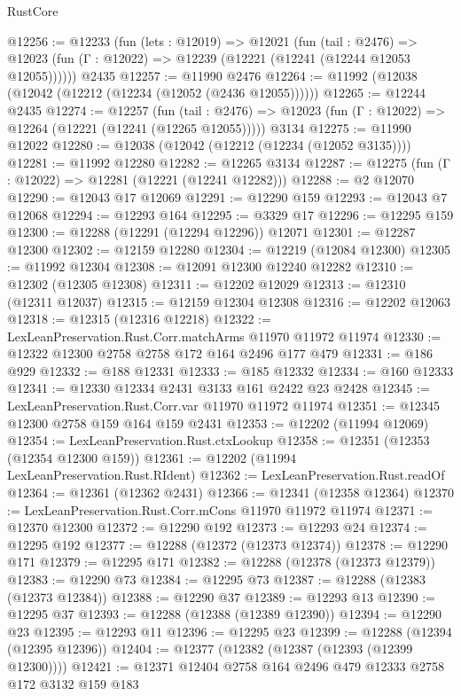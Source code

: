 \begin{lexlean}{RustCore}
\begin{coremodule}
@12256 := @12233
    (fun (lets : @12019) =>
    @12021
      (fun (tail : @2476) =>
      @12023 (fun (Γ : @12022) => @12239 (@12221 (@12241 (@12244 @12053 @12055))))))
    @2435
@12257 := @11990 @2476
@12264 := @11992 (@12038 (@12042 (@12212 (@12234 (@12052 (@2436 @12055))))))
@12265 := @12244 @2435
@12274 := @12257
    (fun (tail : @2476) => @12023 (fun (Γ : @12022) => @12264 (@12221 (@12241 (@12265 @12055)))))
    @3134
@12275 := @11990 @12022
@12280 := @12038 (@12042 (@12212 (@12234 (@12052 @3135))))
@12281 := @11992 @12280
@12282 := @12265 @3134
@12287 := @12275 (fun (Γ : @12022) => @12281 (@12221 (@12241 @12282)))
@12288 := @2 @12070
@12290 := @12043 @17 @12069
@12291 := @12290 @159
@12293 := @12043 @7 @12068
@12294 := @12293 @164
@12295 := @3329 @17
@12296 := @12295 @159
@12300 := @12288 (@12291 (@12294 @12296)) @12071
@12301 := @12287 @12300
@12302 := @12159 @12280
@12304 := @12219 (@12084 @12300)
@12305 := @11992 @12304
@12308 := @12091 @12300 @12240 @12282
@12310 := @12302 (@12305 @12308)
@12311 := @12202 @12029
@12313 := @12310 (@12311 @12037)
@12315 := @12159 @12304 @12308
@12316 := @12202 @12063
@12318 := @12315 (@12316 @12218)
@12322 := LexLeanPreservation.Rust.Corr.matchArms @11970 @11972 @11974
@12330 := @12322 @12300 @2758 @2758 @172 @164 @2496 @177 @479
@12331 := @186 @929
@12332 := @188 @12331
@12333 := @185 @12332
@12334 := @160 @12333
@12341 := @12330 @12334 @2431 @3133 @161 @2422 @23 @2428
@12345 := LexLeanPreservation.Rust.Corr.var @11970 @11972 @11974
@12351 := @12345 @12300 @2758 @159 @164 @159 @2431
@12353 := @12202 (@11994 @12069)
@12354 := LexLeanPreservation.Rust.ctxLookup
@12358 := @12351 (@12353 (@12354 @12300 @159))
@12361 := @12202 (@11994 LexLeanPreservation.Rust.RIdent)
@12362 := LexLeanPreservation.Rust.readOf
@12364 := @12361 (@12362 @2431)
@12366 := @12341 (@12358 @12364)
@12370 := LexLeanPreservation.Rust.Corr.mCons @11970 @11972 @11974
@12371 := @12370 @12300
@12372 := @12290 @192
@12373 := @12293 @24
@12374 := @12295 @192
@12377 := @12288 (@12372 (@12373 @12374))
@12378 := @12290 @171
@12379 := @12295 @171
@12382 := @12288 (@12378 (@12373 @12379))
@12383 := @12290 @73
@12384 := @12295 @73
@12387 := @12288 (@12383 (@12373 @12384))
@12388 := @12290 @37
@12389 := @12293 @13
@12390 := @12295 @37
@12393 := @12288 (@12388 (@12389 @12390))
@12394 := @12290 @23
@12395 := @12293 @11
@12396 := @12295 @23
@12399 := @12288 (@12394 (@12395 @12396))
@12404 := @12377 (@12382 (@12387 (@12393 (@12399 @12300))))
@12421 := @12371
    @12404
    @2758
    @164
    @2496
    @479
    @12333
    @2758
    @172
    @3132
    @159
    @183

\end{coremodule}
\end{lexlean}
